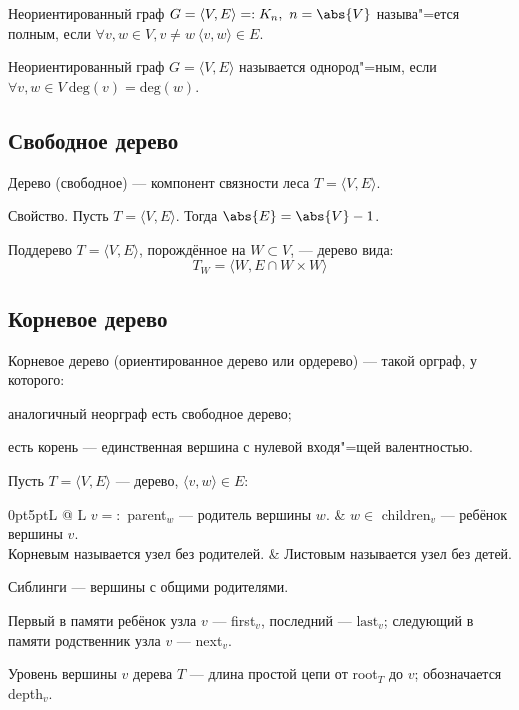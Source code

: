 Неориентированный граф $G=\langle V,E\rangle=:K_n,\ n=\abs{V}$ называ"=ется {\ital полным}, если $\forall v,w\in V,v\neq w\ \langle v,w\rangle\in E$.

Неориентированный граф $G=\langle V,E\rangle$ называется {\ital однород"=ным}, если $\forall v,w\in V\ \text{deg}(v)=\text{deg}(w)$.

\subsection{Свободное дерево}

{\bold Дерево} {\ital (свободное)} --- компонент связности леса $T=\langle V,E\rangle$.

{\ital Свойство.} Пусть $T=\langle V,E\rangle$. Тогда $\abs{E}=\abs{V}-1$.

{\ital Поддерево $T=\langle V,E\rangle$, порождённое} на $W\subset V$, --- дерево вида:
$$T_W=\langle W,E\cap W\times W\rangle$$

\subsection{Корневое дерево}

{\bold Корневое дерево} {\ital (ориентированное дерево или ордерево)} --- такой орграф, у которого:
\begin{list*}
\item аналогичный неорграф есть свободное дерево;
\item есть {\bold корень} --- единственная вершина с нулевой входя"=щей валентностью.
\end{list*}
Пусть $T=\langle V,E\rangle$ --- дерево, $\langle v,w\rangle\in E$:
\begin{tabularcx}{0pt}{5pt}{L @{\quad} L}{\textwidth}
$v=:$ parent$_w$ --- {\ital родитель} вершины $w$. & $w\in$ children$_v$ --- {\ital ребёнок} вершины $v$.\\
{\ital Корневым} называется узел без родителей. & {\ital Листовым} называется узел без детей.
\end{tabularcx}

{\ital Сиблинги} --- вершины с общими родителями.

{\ital Первый} в памяти ребёнок узла $v$ --- first$_v$, {\ital последний} --- $\text{last}_v$; {\ital следующий} в памяти родственник узла $v$ --- next$_v$.

{\ital Уровень} вершины $v$ дерева $T$ --- длина простой цепи от root$_T$ до $v$; обозначается depth$_v$.

